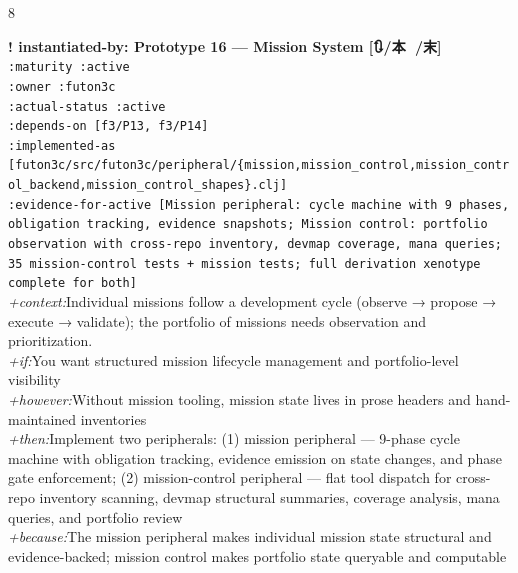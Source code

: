 \documentclass[landscape]{article}
\newcommand{\flexitag}[1]{\textcolor[gray]{0.35}{\textit{#1}}}
\newenvironment{devmapactive}{%
  \def\FrameCommand{\colorbox{devmapactivebg}}%
  \setlength{\fboxsep}{2pt}%
  \MakeFramed{\advance\hsize-\width \FrameRestore}%
}{\endMakeFramed}
\begin{document}
\begin{paracol}{8}
\begin{devmapactive}
\par
\par
\end{devmapactive}
\begin{devmapactive}
\textbf{! instantiated-by: Prototype 16 — Mission System [🔃/本 🌽/末]}\\
  \texttt{:\allowbreak{}maturity :\allowbreak{}active}\\
  \texttt{:\allowbreak{}owner :\allowbreak{}futon3c}\\
  \texttt{:\allowbreak{}actual-\allowbreak{}status :\allowbreak{}active}\\
  \texttt{:\allowbreak{}depends-\allowbreak{}on [f3/\allowbreak{}P13,\allowbreak{} f3/\allowbreak{}P14]}\\
  \texttt{:\allowbreak{}implemented-\allowbreak{}as [futon3c/\allowbreak{}src/\allowbreak{}futon3c/\allowbreak{}peripheral/\allowbreak{}\{mission,\allowbreak{}mission\_\allowbreak{}control,\allowbreak{}mission\_\allowbreak{}control\_\allowbreak{}backend,\allowbreak{}mission\_\allowbreak{}control\_\allowbreak{}shapes\}.clj]}\\
  \texttt{:\allowbreak{}evidence-\allowbreak{}for-\allowbreak{}active [Mission peripheral:\allowbreak{} cycle machine with 9 phases,\allowbreak{} obligation tracking,\allowbreak{} evidence snapshots;\allowbreak{} Mission control:\allowbreak{} portfolio observation with cross-\allowbreak{}repo inventory,\allowbreak{} devmap coverage,\allowbreak{} mana queries;\allowbreak{} 35 mission-\allowbreak{}control tests +\allowbreak{} mission tests;\allowbreak{} full derivation xenotype complete for both]}\\
  \flexitag{+context:}Individual missions follow a development cycle (observe → propose → execute → validate); the portfolio of missions needs observation and prioritization.\\
  \flexitag{+if:}You want structured mission lifecycle management and portfolio-level visibility\\
  \flexitag{+however:}Without mission tooling, mission state lives in prose headers and hand-maintained inventories\\
  \flexitag{+then:}Implement two peripherals: (1) mission peripheral — 9-phase cycle machine with obligation tracking, evidence emission on state changes, and phase gate enforcement; (2) mission-control peripheral — flat tool dispatch for cross-repo inventory scanning, devmap structural summaries, coverage analysis, mana queries, and portfolio review\\
  \flexitag{+because:}The mission peripheral makes individual mission state structural and evidence-backed; mission control makes portfolio state queryable and computable\\

\end{devmapactive}
\end{paracol}
\end{document}
